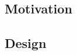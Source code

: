 \subsection{Motivation}
\label{sec:gw-motivation}

\lipsum{}

\subsection{Design}
\label{sec:gw-design}

\lipsum{}
